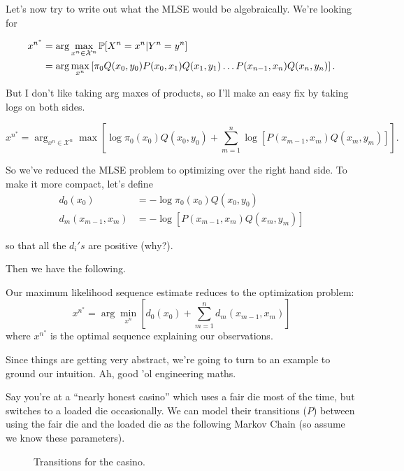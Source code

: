 \documentclass[11 pt]{scrartcl}
\begin{document}
Let's now try to write out what the MLSE would be algebraically. We're looking for 

\begin{align*}
    x^{n^*} &= \arg\max_{x^n \in \mathcal{X}^n} \mathbb P[X^n = x^n | Y^n = y^n] \\ 
            &= \arg\max_{x^n} \left[ \pi_0  Q(x_0, y_0) P(x_0, x_1) Q(x_1, y_1) \dots P(x_{n-1}, x_n) Q(x_n, y_n) \right].
\end{align*}

But I don't like taking arg maxes of products, so I'll make an easy fix by taking logs on both sides. 

\[ x^{n^*} = \arg_{x^n\in\mathcal{X}^n}\max \left[ \log \pi_0(x_0) Q(x_0, y_0) + \sum_{m=1}^n \log\left[P(x_{m-1}, x_m) Q(x_m, y_m) \right]\right] .\]

So we've reduced the MLSE problem to optimizing over the right hand side. To make it more compact, let's define 
\begin{align*}
    d_0(x_0) &= -\log \pi_0(x_0)Q(x_0, y_0) \\ 
    d_m(x_{m-1}, x_m) &= -\log\left[ P(x_{m-1}, x_m) Q(x_m, y_m)\right]
\end{align*}

so that all the $d_i's$ are positive (why?). 

Then we have the following. 

\begin{definition}[MLSE]
    Our maximum likelihood sequence estimate reduces to the optimization problem:
    \[ x^{n^*} = \arg\min_{x^n} \left[ d_0(x_0) + \sum_{m=1}^n d_m(x_{m-1}, x_m)\right]  \]
    where $x^{n^*}$ is the optimal sequence explaining our observations. 
\end{definition}

Since things are getting very abstract, we're going to turn to an example to ground our intuition. Ah, good 'ol engineering maths. 

Say you're at a ``nearly honest casino'' which uses a fair die most of the time, but switches to a loaded die occasionally. We can model their transitions ($P$) between using the fair die and the loaded die as the following Markov Chain (so assume we know these parameters).

\begin{figure}[!h]
\begin{center}
\end{center}
\caption{Transitions for the casino.}
\end{figure}
\end{document}
